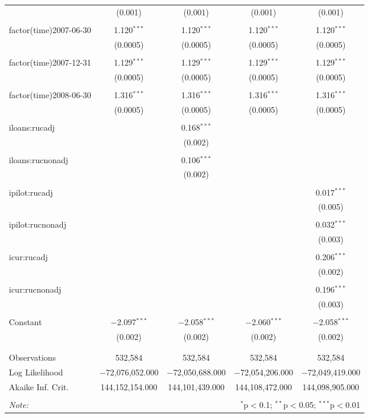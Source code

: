 \begin{table}[!htbp]
\begin{tabular}{@{\extracolsep{5pt}}lcccc}
  & (0.001) & (0.001) & (0.001) & (0.001) \\ 
  & & & & \\ 
 factor(time)2007-06-30 & 1.120$^{***}$ & 1.120$^{***}$ & 1.120$^{***}$ & 1.120$^{***}$ \\ 
  & (0.0005) & (0.0005) & (0.0005) & (0.0005) \\ 
  & & & & \\ 
 factor(time)2007-12-31 & 1.129$^{***}$ & 1.129$^{***}$ & 1.129$^{***}$ & 1.129$^{***}$ \\ 
  & (0.0005) & (0.0005) & (0.0005) & (0.0005) \\ 
  & & & & \\ 
 factor(time)2008-06-30 & 1.316$^{***}$ & 1.316$^{***}$ & 1.316$^{***}$ & 1.316$^{***}$ \\ 
  & (0.0005) & (0.0005) & (0.0005) & (0.0005) \\ 
  & & & & \\ 
 iloans:rucadj &  & 0.168$^{***}$ &  &  \\ 
  &  & (0.002) &  &  \\ 
  & & & & \\ 
 iloans:rucnonadj &  & 0.106$^{***}$ &  &  \\ 
  &  & (0.002) &  &  \\ 
  & & & & \\ 
 ipilot:rucadj &  &  &  & 0.017$^{***}$ \\ 
  &  &  &  & (0.005) \\ 
  & & & & \\ 
 ipilot:rucnonadj &  &  &  & 0.032$^{***}$ \\ 
  &  &  &  & (0.003) \\ 
  & & & & \\ 
 icur:rucadj &  &  &  & 0.206$^{***}$ \\ 
  &  &  &  & (0.002) \\ 
  & & & & \\ 
 icur:rucnonadj &  &  &  & 0.196$^{***}$ \\ 
  &  &  &  & (0.003) \\ 
  & & & & \\ 
 Constant & $-$2.097$^{***}$ & $-$2.058$^{***}$ & $-$2.060$^{***}$ & $-$2.058$^{***}$ \\ 
  & (0.002) & (0.002) & (0.002) & (0.002) \\ 
  & & & & \\ 
\hline \\[-1.8ex] 
Observations & 532,584 & 532,584 & 532,584 & 532,584 \\ 
Log Likelihood & $-$72,076,052.000 & $-$72,050,688.000 & $-$72,054,206.000 & $-$72,049,419.000 \\ 
Akaike Inf. Crit. & 144,152,154.000 & 144,101,439.000 & 144,108,472.000 & 144,098,905.000 \\ 
\hline 
\hline \\[-1.8ex] 
\textit{Note:}  & \multicolumn{4}{r}{$^{*}$p$<$0.1; $^{**}$p$<$0.05; $^{***}$p$<$0.01} \\ 
\end{tabular} 
\end{table} 
